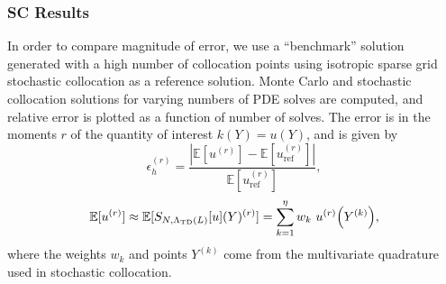 \documentclass[11pt]{article}
\newcommand{\expv}[1]{\ensuremath{\mathbb{E}[ #1]}}
\begin{document}
\subsubsection{SC Results}
In order to compare magnitude of error, we use a ``benchmark'' solution generated with a high number of collocation points using isotropic sparse grid stochastic collocation as a reference solution.  Monte Carlo and stochastic collocation solutions for varying numbers of PDE solves are computed, and relative error is plotted as a function of number of solves.  The error is in the moments $r$ of the quantity of interest $k(Y)=u(Y)$, and is given by
\begin{equation}
\epsilon_h^{(r)}=\frac{|\expv{u^{(r)}}-\expv{u_\text{ref}^{(r)}}|}{\expv{u_\text{ref}^{(r)}}},
\end{equation}
\begin{equation}
\expv{u^{(r)}}\approx\expv{S_{N,\Lambda_\text{TD}(L)}[u](Y)^{(r)}}=\sum_{k=1}^\eta w_k ~u^{(r)}\qty(Y^{(k)}),
\end{equation}
where the weights $w_k$ and points $Y^{(k)}$ come from the multivariate quadrature used in stochastic collocation.\\
%
%
\end{document}
